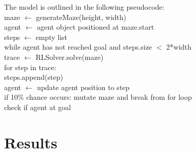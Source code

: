 \documentclass{article}
\begin{document}
The model is outlined in the following pseudocode:\\
\hspace*{2cm}maze $\leftarrow$ generateMaze(height, width)\\
\hspace*{2cm}agent $\leftarrow$ agent object positioned at maze.start\\
\hspace*{2cm}steps $\leftarrow$ empty list\\
\hspace*{2cm}while agent has not reached goal and steps.size $<$ 2*width\\
\hspace*{3cm}trace $\leftarrow$ RLSolver.solve(maze)\\
\hspace*{3cm}for step in trace:\\
	\hspace*{4cm}steps.append(step)\\
	\hspace*{4cm}agent $\leftarrow$ update agent position to step\\
	\hspace*{4cm}if 10\% chance occurs: mutate maze and break from for loop\\
\hspace*{2cm}check if agent at goal


    \section{Results}\label{sec:results}
\end{document}
